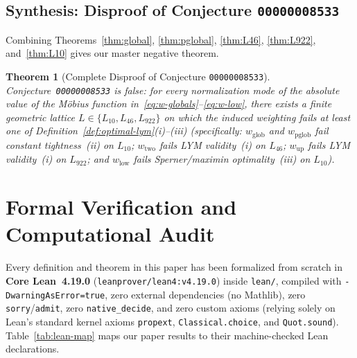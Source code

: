 \documentclass[11pt]{article}
\newtheorem{theorem}{Theorem}[section]
\theoremstyle{definition}
\theoremstyle{remark}
\begin{document}
\subsection{Synthesis: Disproof of Conjecture \texttt{00000008533}}

Combining Theorems~\ref{thm:global}, \ref{thm:pglobal}, \ref{thm:L46}, \ref{thm:L922}, and~\ref{thm:L10} gives our master negative theorem.

\begin{theorem}[Complete Disproof of Conjecture \texttt{00000008533}]\label{thm:master-disproof}
Conjecture~\texttt{00000008533} is false: for \emph{every} normalization mode of the absolute value of the M\"obius function in~\eqref{eq:w-globals}--\eqref{eq:w-low}, there exists a finite geometric lattice $L \in \{L_{10}, L_{46}, L_{922}\}$ on which the induced weighting fails at least one of Definition~\ref{def:optimal-lym}(i)--(iii) (specifically: $w_{\mathrm{glob}}$ and $w_{\mathrm{pglob}}$ fail constant tightness~(ii) on $L_{10}$; $w_{\mathrm{two}}$ fails LYM validity~(i) on $L_{46}$; $w_{\mathrm{up}}$ fails LYM validity~(i) on $L_{922}$; and $w_{\mathrm{low}}$ fails Sperner/maximin optimality~(iii) on $L_{10}$).
\end{theorem}

\section{Formal Verification and Computational Audit}

Every definition and theorem in this paper has been formalized from scratch in \textbf{Core Lean~4.19.0} (\texttt{leanprover/lean4:v4.19.0}) inside \texttt{lean/}, compiled with \texttt{-DwarningAsError=true}, zero external dependencies (no Mathlib), zero \texttt{sorry}/\texttt{admit}, zero \texttt{native\_decide}, and zero custom axioms (relying solely on Lean's standard kernel axioms \texttt{propext}, \texttt{Classical.choice}, and \texttt{Quot.sound}). Table~\ref{tab:lean-map} maps our paper results to their machine-checked Lean declarations.
\end{document}
